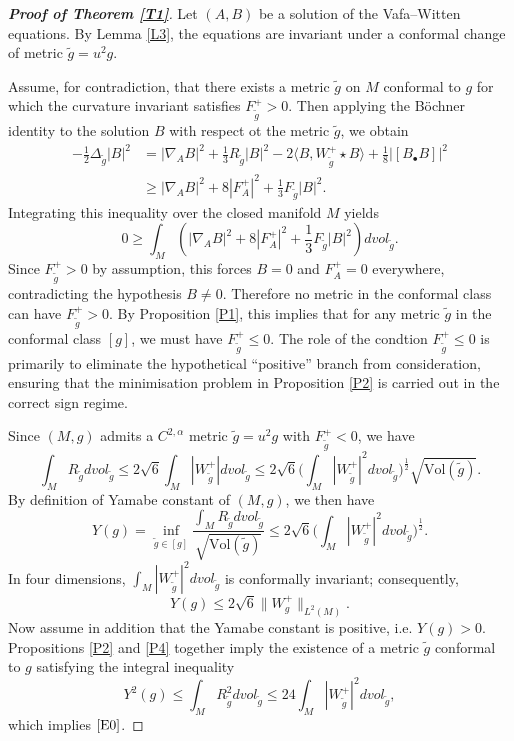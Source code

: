\documentclass[12pt, twoside]{article}
\theoremstyle{definition}
\numberwithin{equation}{section}
\def \a {\alpha }
\def \De {\Delta}
\def\na {\nabla}
\begin{document}
\begin{proof}[\textbf{Proof of Theorem \ref{T1}}]
Let $(A,B)$ be a solution of the Vafa--Witten equations. By Lemma \ref{L3}, the equations are invariant under a conformal change of metric $\tilde{g}=u^{2}g$. 

Assume, for contradiction, that there exists a metric $\tilde{g}$ on $M$ conformal to $g$ for which the curvature invariant satisfies $F^{+}_{\tilde{g}}>0$. Then applying the Böchner identity to the solution $B$ with respect ot the metric $\tilde{g}$, we obtain
\begin{equation*}
	\begin{split}
	-\frac{1}{2}\De_{\tilde{g}}|B|^{2}
	&=|\na_{A}B|^{2}+\frac{1}{3}R_{\tilde{g}}|B|^{2}-2\langle B,W^{+}_{\tilde{g}}\star B\rangle+\frac{1}{8}|[B_{\bullet}B]|^{2}\\
	&\geq |\na_{A}B|^{2}+8|F_{A}^{+}|^{2}+\frac{1}{3}F_{\tilde{g}}|B|^{2}.
	\end{split}
	\end{equation*}
Integrating this inequality over the closed manifold $M$ yields
	\[0\geq \int_{M}(|\na_{A}B|^{2}+8|F_{A}^{+}|^{2}+\frac{1}{3}F_{\tilde{g}}|B|^{2})dvol_{\tilde{g}}. \]
Since $F_{\tilde{g}}^{+}>0$ by assumption, this forces $B=0$ and $F_{A}^{+}=0$ everywhere, contradicting the hypothesis $B\neq0$.
Therefore no metric in the conformal class can have $F_{\tilde{g}}^{+}>0$. By Proposition \ref{P1}, this implies that for any metric $\tilde{g}$ in the conformal class $[g]$, we must have $F_{\tilde{g}}^{+}\leq0$.
The role of the condtion $F_{\tilde{g}}^{+}\leq0$ is primarily to eliminate the hypothetical “positive” branch from consideration, 
ensuring that the minimisation problem in Proposition \ref{P2} is carried out in the correct sign regime.  

Since $(M,g)$ admits a $C^{2,\a}$ metric $\tilde{g}=u^{2}g$ with $F_{\tilde{g}}^{+}<0$, we have
\[\int_{M}R_{\tilde{g}}dvol_{\tilde{g}}\leq 2\sqrt{6}\int_{M}|W^{+}_{\tilde{g}}|dvol_{\tilde{g}}\leq 2\sqrt{6}\Big(\int_{M}|W^{+}_{\tilde{g}}|^{2}dvol_{\tilde{g}}\Big)^{\frac{1}{2}}\sqrt{\mathrm{Vol}(\tilde{g})}.\]
By definition of Yamabe constant of $(M,g)$, we then have
\[Y(g)=\inf_{\tilde{g}\in [g]}\frac{\int_{M}R_{\tilde{g}}dvol_{\tilde{g}} }{\sqrt{\mathrm{Vol}(\tilde{g})}}\leq 2\sqrt{6}\Big(\int_{M}|W^{+}_{\tilde{g}}|^{2}dvol_{\tilde{g}}\Big)^{\frac{1}{2}} . \]
In four dimensions, $\int_{M}|W^{+}_{\tilde{g}}|^{2}dvol_{\tilde{g}}$ is conformally invariant; consequently, 
$$Y(g)\leq2\sqrt{6}\|W^{+}_{g}\|_{L^{2}(M)}.$$
Now assume in addition that the Yamabe constant is positive, i.e.  $Y(g)>0$. Propositions \ref{P2} and \ref{P4} together imply the existence of a metric $\tilde{g}$ conformal to $g$ satisfying the integral inequality
\begin{equation}\label{E12}
Y^{2}(g)\leq \int_{M}R^{2}_{\tilde{g}}dvol_{\tilde{g}}\leq 24\int_{M}|W^{+}_{\tilde{g}}|^{2}dvol_{\tilde{g}},
\end{equation}
which implies $\eqref{E0}$.


\end{proof}
\end{document}
